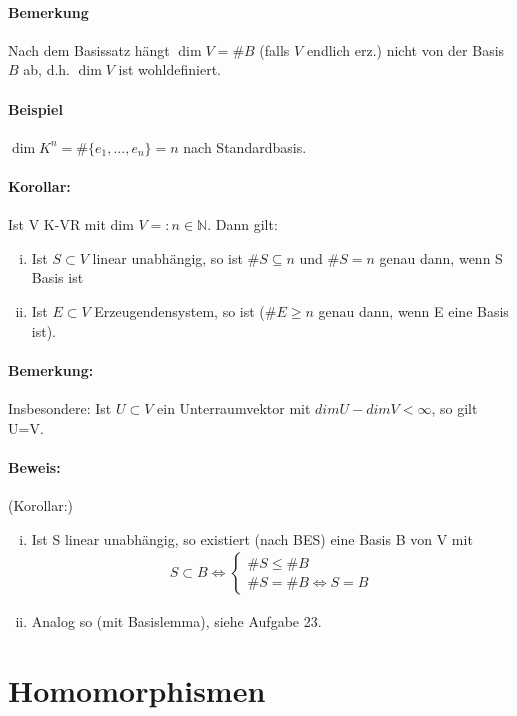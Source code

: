 \paragraph{Bemerkung}
    Nach dem Basissatz hängt $\dim V = \#B$ (falls $V$ endlich erz.) nicht von der Basis $B$ ab, d.h. $\dim V$ ist wohldefiniert.
\paragraph{Beispiel}
    $\dim K^n = \#\{e_1,...,e_n\} = n$ nach Standardbasis.

\paragraph{Korollar:} Ist V K-VR mit dim $V =: n\in \mathbb{N}$. Dann gilt:
    \begin{enumerate}[(i)]
    	\item Ist $S \subset V$ linear unabhängig, so ist $\# S \subseteq n$ und $\# S = n$ genau dann, wenn S Basis ist
    	\item Ist $E \subset V$ Erzeugendensystem, so ist ($\#E \geq n$ genau dann, wenn E eine Basis ist).
    \end{enumerate}
    \paragraph{Bemerkung:} Insbesondere: Ist $U\subset V$ ein Unterraumvektor mit $dimU-dimV < \infty$, so gilt U=V.
   
    \paragraph{Beweis:} (Korollar:)
    \begin{enumerate}[(i)]
    	\item Ist S linear unabhängig, so existiert (nach BES) eine Basis B von V mit 
			 \begin{gather*}
			    S\subset B\Leftrightarrow \left\{
				    \begin{array}{l}
					    \#S \leq \#B\\
						\#S = \#B \Leftrightarrow S = B
					\end{array}
			    \right.
		    \end{gather*}
		    \item Analog so (mit Basislemma), siehe Aufgabe 23.
	 \end{enumerate}   

\section{Homomorphismen}
